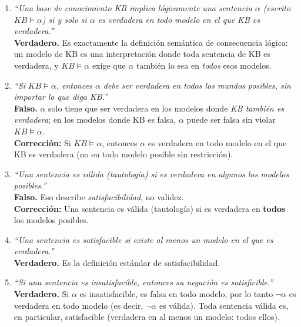 \begin{enumerate}
    \item \textit{``Una base de conocimiento KB implica lógicamente una sentencia $\alpha$ (escrito
    $KB \models \alpha$) si y solo si $\alpha$ es verdadera en todo modelo en el que KB es
    verdadera.''}\\
    \textbf{Verdadero.} Es exactamente la definición semántica de consecuencia lógica: un modelo de
    KB es una interpretación donde toda sentencia de KB es verdadera, y $KB \models \alpha$ exige que
    $\alpha$ también lo sea en \emph{todos} esos modelos.

    \item \textit{``Si $KB \models \alpha$, entonces $\alpha$ debe ser verdadera en todos los mundos
    posibles, sin importar lo que diga KB.''}\\
    \textbf{Falso.} $\alpha$ solo tiene que ser verdadera en los modelos donde \emph{KB también es
    verdadera}; en los modelos donde KB es falsa, $\alpha$ puede ser falsa sin violar $KB \models
    \alpha$.\\
    \textbf{Corrección:} Si $KB \models \alpha$, entonces $\alpha$ es verdadera en todo modelo en el
    que KB es verdadera (no en todo modelo posible sin restricción).

    \item \textit{``Una sentencia es válida (tautología) si es verdadera en algunos los modelos
    posibles.''}\\
    \textbf{Falso.} Eso describe \emph{satisfacibilidad}, no validez.\\
    \textbf{Corrección:} Una sentencia es válida (tautología) si es verdadera en \textbf{todos} los
    modelos posibles.

    \item \textit{``Una sentencia es satisfacible si existe al menos un modelo en el que es
    verdadera.''}\\
    \textbf{Verdadero.} Es la definición estándar de satisfacibilidad.

    \item \textit{``Si una sentencia es insatisfacible, entonces su negación es satisficible.''}\\
    \textbf{Verdadero.} Si $\alpha$ es insatisfacible, es falsa en todo modelo, por lo tanto $\neg
    \alpha$ es verdadera en todo modelo (es decir, $\neg\alpha$ es válida). Toda sentencia válida es,
    en particular, satisfacible (verdadera en al menos un modelo: todos ellos).
\end{enumerate}

